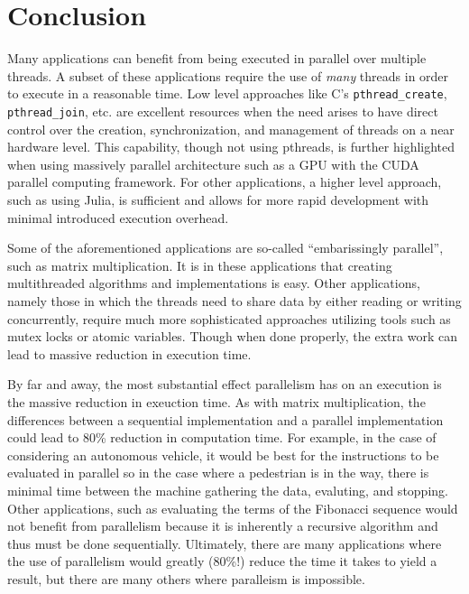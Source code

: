 \documentclass{article}
\begin{document}
\section{Conclusion}

    Many applications can benefit from being executed in parallel over multiple threads.  A subset of these applications require the use of \emph{many} threads in order to execute in a reasonable time.  Low level approaches like C's \verb|pthread_create|, \verb|pthread_join|, etc. are excellent resources when the need arises to have direct control over the creation, synchronization, and management of threads on a near hardware level.  This capability, though not using pthreads, is further highlighted when using massively parallel architecture such as a GPU with the CUDA parallel computing framework.  For other applications, a higher level approach, such as using Julia, is sufficient and allows for more rapid development with minimal introduced execution overhead.

    Some of the aforementioned applications are so-called ``embarissingly parallel'', such as matrix multiplication.  It is in these applications that creating multithreaded algorithms and implementations is easy.  Other applications, namely those in which the threads need to share data by either reading or writing concurrently, require much more sophisticated approaches utilizing tools such as mutex locks or atomic variables.  Though when done properly, the extra work can lead to massive reduction in execution time.

    By far and away, the most substantial effect parallelism has on an execution is the massive reduction in exeuction time.  As with matrix multiplication, the differences between a sequential implementation and a parallel implementation could lead to 80\% reduction in computation time.  For example, in the case of considering an autonomous vehicle, it would be best for the instructions to be evaluated in parallel so in the case where a pedestrian is in the way, there is minimal time between the machine gathering the data, evaluting, and stopping.  Other applications, such as evaluating the terms of the Fibonacci sequence would not benefit from parallelism because it is inherently a recursive algorithm and thus must be done sequentially.  Ultimately, there are many applications where the use of parallelism would greatly (80\%!) reduce the time it takes to yield a result, but there are many others where paralleism is impossible.
\end{document}
